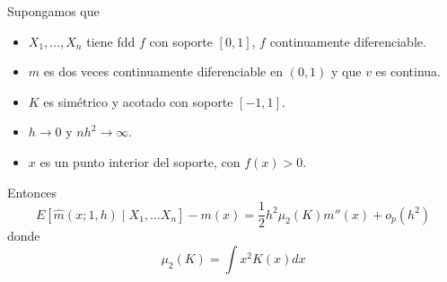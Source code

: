 \documentclass[MyPE.tex]{subfiles}
\begin{document}
\begin{theorem}
Supongamos que
\begin{itemize}
\item $X_1,\dotsc,X_n$ tiene fdd $f$ con soporte $[0,1]$, $f$ continuamente diferenciable.
\item $m$ es dos veces continuamente diferenciable en $(0,1)$ y que $v$ es continua.
\item $K$ es simétrico y acotado con soporte $[-1,1]$.
\item $h\to 0$ y $nh^2 \to \infty$.
\item $x$ es un punto interior del soporte, con $f(x)>0$.
\end{itemize}
Entonces
$$
E[\hat{m}(x;1,h)\mid X_1,\dotsc X_n]-m(x) = \frac{1}{2}h^2\mu_2(K)m''(x)+o_p(h^2)
$$
donde 
$$
\mu_2(K) = \int x^2 K(x)dx
$$
\end{theorem}
\end{document}
